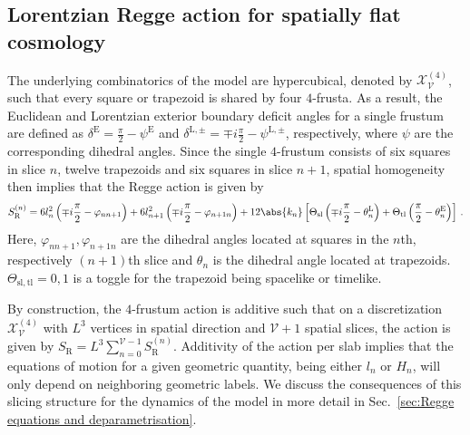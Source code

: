 \subsection{Lorentzian Regge action for spatially flat cosmology}\label{sec:Lorentzian Regge action for spatially flat cosmology}

The underlying combinatorics of the model are hypercubical, denoted by $\mathcal{X}^{(4)}_{\mathcal{V}}$, such that every square or trapezoid is shared by four $4$-frusta. As a result, the Euclidean and Lorentzian exterior boundary deficit angles for a single frustum are defined as $\delta^{\mathrm{E}} = \frac{\pi}{2} - \psi^{\mathrm{E}}$ and $\delta^{\mathrm{L},\pm} = \mp i\frac{\pi}{2} - \psi^{\mathrm{L},\pm}$, respectively, where $\psi$ are the corresponding dihedral angles. Since the single $4$-frustum consists of six squares in slice $n$, twelve trapezoids and six squares in slice $n+1$, spatial homogeneity then implies that the Regge action is given by
%
\begin{equation}\label{eq:slice Regge action}
\begin{aligned}
S_{\mathrm{R}}^{(n)} = 6l_n^2\left(\mp i\frac{\pi}{2}-\varphi_{nn+1}\right)+6l_{n+1}^2\left(\mp i\frac{\pi}{2}-\varphi_{n+1n}\right)+ 12\abs{k_n}\left[\Theta_{\mathrm{sl}}\left(\mp i\frac{\pi}{2}-\theta_n^{\mathrm{L}}\right) + \Theta_{\mathrm{tl}}\left(\frac{\pi}{2} - \theta_n^{\mathrm{E}}\right)\right]\,.
\end{aligned}
\end{equation}
%
Here, $\varphi_{nn+1},\varphi_{n+1n}$ are the dihedral angles located at squares in the $n$th, respectively $(n+1)$th slice and $\theta_n$ is the dihedral angle located at trapezoids. $\Theta_{\mathrm{sl,tl}}=0,1$ is a toggle for the trapezoid being spacelike or timelike.

By construction, the $4$-frustum action is additive such that on a discretization $\mathcal{X}^{(4)}_{\mathcal{V}}$ with $L^3$ vertices in spatial direction and $\mathcal{V}+1$ spatial slices, the action is given by $S_{\mathrm{R}} = L^3\sum_{n=0}^{\mathcal{V}-1}S_{\mathrm{R}}^{(n)}$. Additivity of the action per slab implies that the equations of motion for a given geometric quantity, being either $l_n$ or $H_n$, will only depend on neighboring geometric labels. We discuss the consequences of this slicing structure for the dynamics of the model in more detail in Sec.~\ref{sec:Regge equations and deparametrisation}. 

